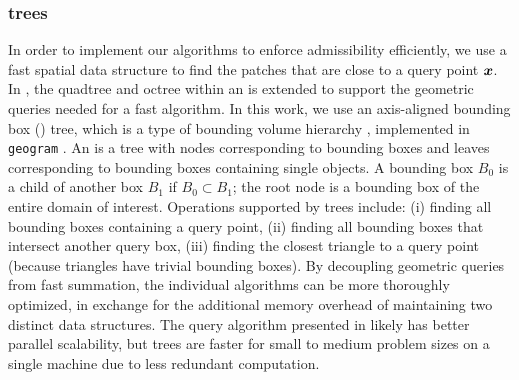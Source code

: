 \subsubsection{\aabb trees\label{sec:aabb_trees}} 
In order to implement our algorithms to enforce admissibility efficiently, we use a fast spatial data structure to find the patches that are close to a query point ${\bm{x}}$.
In \cite{RKO, wala20193d}, the quadtree and octree within an \fmm is extended to support the geometric queries needed for a fast \qbx  algorithm.
In this work, we use an axis-aligned bounding box (\aabb) tree, which is a type of bounding volume hierarchy \cite{samet2006foundations}, implemented in \texttt{geogram} \cite{geogram}.
An \aabb is a tree with nodes corresponding to bounding boxes and leaves corresponding to bounding boxes containing single objects. 
A bounding box $B_0$ is a child of another box $B_1$ if $B_0 \subset B_1$; the root node is a bounding box of the entire domain of interest.
Operations supported by \aabb trees include: (i) finding all bounding boxes containing a query point, (ii) finding all bounding boxes that intersect another query box, (iii) finding the closest triangle to a query point (because triangles have trivial bounding boxes). 
By decoupling geometric queries from fast summation, the individual algorithms can be more thoroughly optimized, in exchange for the additional memory overhead of maintaining two distinct data structures.
The query algorithm presented in \cite{lu2019scalable} likely has better parallel scalability, but \aabb trees are faster for small to medium problem sizes on a single machine due to less redundant computation.

